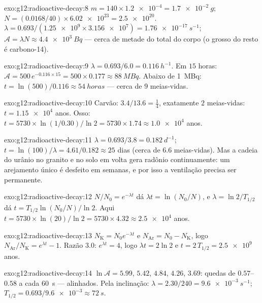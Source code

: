 \begin{solution}{exo:g12:radioactive-decay:8}
$m = 140 \times \num{1.2e-4} = \qty{1.7e-2}{g}$;
$N = (0.0168/40) \times \num{6.02e23} = \num{2.5e20}$.
$\lambda = 0.693/(\num{1.25e9} \times \num{3.156e7}) =
\qty{1.76e-17}{s^{-1}}$;
$\mathcal A = \lambda N \approx \qty{4.4e3}{Bq}$ --- cerca de metade do
total do corpo (o grosso do resto é carbono-14).
\end{solution}

\begin{solution}{exo:g12:radioactive-decay:9}
$\lambda = 0.693/6.0 = \qty{0.116}{h^{-1}}$. Em $15$ horas:
$\mathcal A = 500\,e^{-0.116 \times 15} = 500 \times 0.177 \approx
\qty{88}{MBq}$. Abaixo de \qty{1}{MBq}:
$t = \ln(500)/0.116 \approx \qty{54}{horas}$ --- cerca de $9$
meias-vidas.
\end{solution}

\begin{solution}{exo:g12:radioactive-decay:10}
Carvão: $3.4/13.6 = \tfrac14$, exatamente $2$ meias-vidas:
$t = \num{1.15e4}$ anos. Osso:
$t = \num{5730} \times \ln(1/0.30)/\ln 2 = \num{5730} \times 1.74
\approx \num{1.0e4}$ anos.
\end{solution}

\begin{solution}{exo:g12:radioactive-decay:11}
$\lambda = 0.693/3.8 = \qty{0.182}{d^{-1}}$;
$t = \ln(100)/\lambda = 4.61/0.182 \approx 25$ dias (cerca de $6.6$
meias-vidas). Mas a cadeia do urânio no granito e no solo em volta gera
radônio continuamente: um arejamento único é desfeito em semanas, e por
isso a ventilação precisa ser permanente.
\end{solution}

\begin{solution}{exo:g12:radioactive-decay:12}
$N/N_0 = e^{-\lambda t}$ dá $\lambda t = \ln(N_0/N)$, e
$\lambda = \ln 2/T_{1/2}$ dá $t = T_{1/2}\ln(N_0/N)/\ln 2$. Aqui
$t = \num{5730} \times \ln(20)/\ln 2 = \num{5730} \times 4.32 \approx
\num{2.5e4}$ anos.
\end{solution}

\begin{solution}{exo:g12:radioactive-decay:13}
$N_{\mathrm K} = N_0 e^{-\lambda t}$ e
$N_{\mathrm{Ar}} = N_0 - N_{\mathrm K}$, logo
$N_{\mathrm{Ar}}/N_{\mathrm K} = e^{\lambda t} - 1$. Razão $3.0$:
$e^{\lambda t} = 4$, logo $\lambda t = 2\ln 2$ e
$t = 2\,T_{1/2} = \num{2.5e9}$ anos.
\end{solution}

\begin{solution}{exo:g12:radioactive-decay:14}
$\ln \mathcal A = 5.99$, $5.42$, $4.84$, $4.26$, $3.69$: quedas de
$0.57$--$0.58$ a cada \qty{60}{s} --- alinhados. Pela inclinação:
$\lambda = 2.30/240 = \qty{9.6e-3}{s^{-1}}$;
$T_{1/2} = 0.693/\num{9.6e-3} \approx \qty{72}{s}$.
\end{solution}

